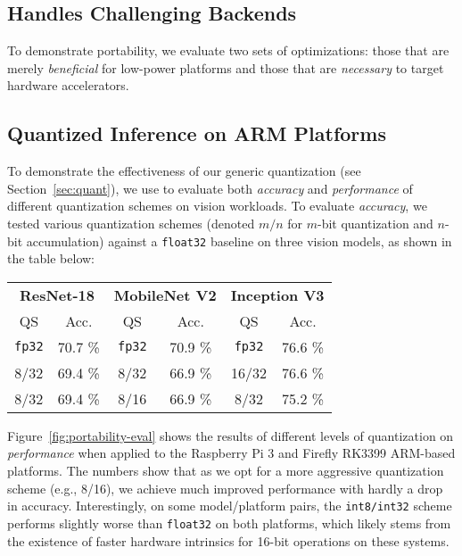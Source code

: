 \subsection{\relay Handles Challenging Backends}
\label{sec:low-power}
To demonstrate portability,
  we evaluate two sets of optimizations:
    those that are merely \textit{beneficial} for low-power platforms and
    those that are \textit{necessary} to target hardware accelerators.

\subsection*{Quantized Inference on ARM Platforms}
To demonstrate the effectiveness of our generic quantization (see Section~\ref{sec:quant}),
  we use \relay to evaluate both \textit{accuracy} and \textit{performance} of different
  quantization schemes on vision workloads.
To evaluate \textit{accuracy},
  we tested various quantization schemes
  (denoted $m/n$ for $m$-bit quantization and $n$-bit accumulation)
  against a \texttt{float32} baseline on three vision models,
  as shown in the table below:
\begin{center}
  \begin{tabular}{|c|c||c|c||c|c|}
    \hline
    \multicolumn{2}{|c}{\textbf{ResNet-18}} & \multicolumn{2}{c}{\textbf{MobileNet V2}} & \multicolumn{2}{c|}{\textbf{Inception V3}} \\
    \multicolumn{1}{|c}{QS}    & \multicolumn{1}{c}{Acc.}   &  \multicolumn{1}{c}{QS}  & \multicolumn{1}{c}{Acc.}  & \multicolumn{1}{c}{QS}  & \multicolumn{1}{c|}{Acc.} \\
    \hline
    \texttt{fp32} & 70.7 \%    & \texttt{fp32} & 70.9 \%       & \texttt{fp32} & 76.6 \% \\
    8/32         & 69.4 \%    & 8/32         & 66.9 \%       & 16/32        & 76.6 \% \\
    8/32         & 69.4 \%    & 8/16         & 66.9 \%       & 8/32         & 75.2 \% \\
    \hline
  \end{tabular}
\end{center}
Figure~\ref{fig:portability-eval} shows the results of different
  levels of quantization on \textit{performance} when applied to the Raspberry Pi 3
  and Firefly RK3399 ARM-based platforms.
The numbers show that as we opt for a more aggressive quantization scheme
  (e.g., 8/16),
  we achieve much improved performance with hardly a drop in accuracy.
Interestingly,
  on some model/platform pairs,
  the \texttt{int8/int32} scheme performs slightly worse than \texttt{float32} on both platforms,
  which likely stems from the existence of faster hardware intrinsics for 16-bit operations on these systems.


